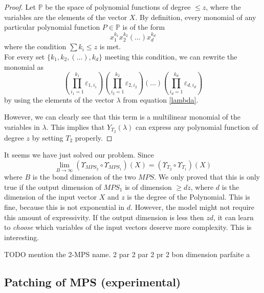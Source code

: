 \documentclass{article}
\theoremstyle{definition}
\theoremstyle{definition}
\begin{document}
\begin{proof}
Let $\mathbb{P}$ be the space of polynomial functions 
of degree $\leq z$, where the variables are the elements of the vector $X$. By definition, every monomial of any particular polynomial function $P \in \mathbb{P}$ is of the form
\begin{equation}
    x_{1}^{k_1}x_{2}^{k_2}(\dots)x_{d}^{k_d}
\end{equation}
where the condition $\sum k_i \leq z$ is met. \\
For every set $\{k_1, k_2, (\dots), k_d\}$ meeting this condition,
we can rewrite the monomial as
\begin{equation}
    \left( \prod_{i_1=1}^{k_1}\varepsilon_{1, i_1} \right)
    \left( \prod_{i_2=1}^{k_2}\varepsilon_{2, i_2} \right)
    \left( \dots \right)
    \left( \prod_{i_d=1}^{k_d}\varepsilon_{d, i_d} \right)
\end{equation}
by using the elements of the vector $\lambda$ from equation \eqref{lambda}.

However, we can clearly see that this term is a multilinear 
monomial of the variables in $\lambda$. This implies that
$Y_{T_2}(\lambda)$ can express any polynomial function of degree $z$ by setting $T_2$ properly.





\end{proof}
It seems we have just solved our problem. Since
\[
    \lim_{B\to\infty}
    \left(\Upsilon_{MPS_2} \circ \Upsilon_{MPS_1}\right) (X)
    =
    \left(\Upsilon_{T_2} \circ \Upsilon_{T_1}\right) (X)
\]
where $B$ is the bond dimension of the two $MPS$.
We only proved that this is only true if the output dimension of $MPS_1$ is of dimension $\geq dz$, where $d$ is the dimension of the input vector $X$ and $z$ is the degree of the Polynomial. This is fine, because this is not exponential in $d$. However, the model might not require this amount of expressivity. If the output dimension is less then $zd$, it can learn to \emph{choose} which variables of the input vectors deserve more complexity. This is interesting.


TODO mention the 2-MPS name.
2 par 2 par 2 pr 2
bon dimension parfaite a 

\subsection{Patching of MPS (experimental)}
\end{document}
